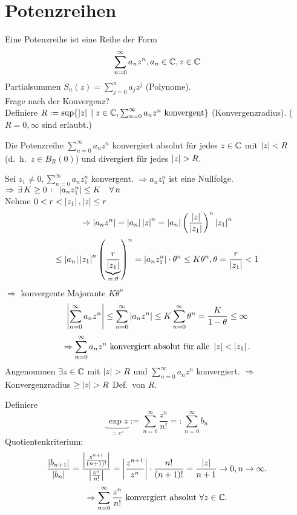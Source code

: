 \documentclass[../ana1.tex]{subfiles}
\begin{document}
\setcounter{section}{13}
\section{Potenzreihen}

\begin{prosa}
    Eine Potenzreihe ist eine Reihe der Form
    \[ \sum_{n=0}^\infty a_n z^n, a_n \in\mathbb{C}, z \in\mathbb{C} \] 
    Partialsummen \( S_n(z) = \sum_{j=0}^n a_j z^j \) (Polynome).\\
    Frage nach der Konvergenz?\\
    Definiere \( R:= \sup \{ \left|z\right| \;\vert \; z\in\mathbb{C}, \sum_{n=0}^\infty a_n z^n \text{ konvergent} \} \)
    (Konvergenzradius). (\( R = 0, \infty \) sind erlaubt.)
\end{prosa}
\begin{lem}
    Die Potenzreihe \( \sum_{n=0}^\infty a_n z^n \) konvergiert absolut für jedes \( z\in\mathbb{C} \) mit \( \left|z\right| < R \) (d.\ h.\  \( z\in B_R(0) \)) und divergiert für jedes \( \left|z\right| > R \).
\end{lem}
\begin{bew}
    Sei \( z_1 \neq 0, \sum_{n=0}^\infty a_n z_1^n \) konvergent.
    \( \Rightarrow a_n z_1^n \) ist eine Nullfolge.
    \( \Rightarrow \, \exists \, K \geq 0 \; \colon \; \left|a_n z_1^n\right| \leq K \quad \forall \, n \) \\
    Nehme \( 0<r < \left|z_1\right|, \left|z\right| \leq r \)
    \[ \Rightarrow \left|a_n z^n\right| = \left|a_n\right| \left|z\right|^n = \left|a_n\right| { \left( \frac{\left|z\right|}{\left|z_1\right|} \right) }^n \left|z_1\right|^n \]
    \[ \leq \left|a_n\right|\left|z_1\right|^n {\left( \underbrace{\frac{r}{\left|z_1\right|}}_{=: \theta} \right)}^n = \left|a_n z_1^n\right| \cdot \theta^n \leq K \theta^n, \theta = \frac{r}{\left|z_1\right|} < 1 \]
    \( \Rightarrow \) konvergente Majorante \( K \theta^n \) \\
    \[ \left| \sum_{n=0}^\infty a_n z^n \right| \leq \sum_{n=0}^\infty \left| a_n z^n \right| \leq K \sum_{n=0}^\infty \theta^n = \frac{K}{1 - \theta} \leq \infty \]
    \[ \Rightarrow \sum_{n=0}^\infty a_n z^n \text{ konvergiert absolut für alle } \left|z\right| < \left|z_1\right|. \]
    Angenommen \( \exists z\in\mathbb{C} \) mit \( \left|z\right| > R \) und \( \sum_{n=0}^\infty a_n z^n \) konvergiert.
    \( \Rightarrow \) Konvergenzradius \(\geq \left|z\right| > R \) \Lightning{} Def.\ von \(R\).
\end{bew}
\begin{bsp}
    Definiere
    \[ \underbrace{\exp z}_{=e^z} := \sum_{n=0}^\infty \frac{z^n}{n!} =: \sum_{n=0}^\infty b_n \]
    Quotientenkriterium:
    \[ \frac{\left|b_{n+1}\right|}{\left|b_n\right|} = \frac{ \left| \frac{ z^{n+1} }{ (n+1)! } \right| }{ \left| \frac{ z^n }{ n! } \right| } = \left| \frac{ z^{n+1} }{ z^n } \right| \cdot \frac{ n! }{ (n+1)! } = \frac{\left|z\right|}{n+1} \rightarrow 0, n\rightarrow\infty. \]
    \[ \Rightarrow \sum_{n=0}^\infty \frac{z^n}{n!} \text{ konvergiert absolut } \forall z\in\mathbb{C}. \]
\end{bsp}
\end{document}

